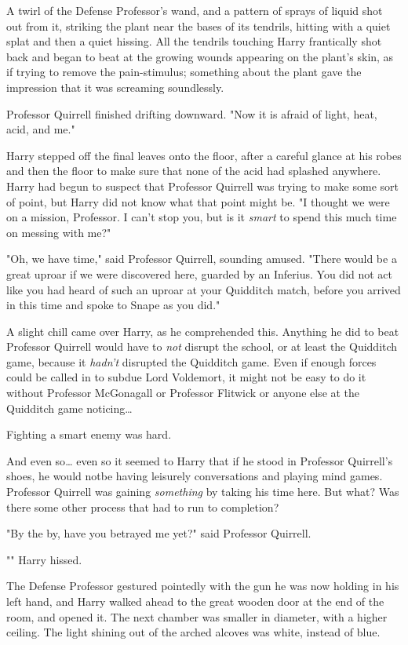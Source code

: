 A twirl of the Defense Professor's wand, and a pattern of sprays of liquid shot 
out from it, striking the plant near the bases of its tendrils, hitting with a 
quiet splat and then a quiet hissing. All the tendrils touching Harry 
frantically shot back and began to beat at the growing wounds appearing on the 
plant's skin, as if trying to remove the pain-stimulus; something about the 
plant gave the impression that it was screaming soundlessly.

Professor Quirrell finished drifting downward. "Now it is afraid of light, 
heat, acid, and me."

Harry stepped off the final leaves onto the floor, after a careful glance at 
his robes and then the floor to make sure that none of the acid had splashed 
anywhere. Harry had begun to suspect that Professor Quirrell was trying to make 
some sort of point, but Harry did not know what that point might be. "I thought 
we were on a mission, Professor. I can't stop you, but is it \emph{smart} to 
spend this much time on messing with me?"

"Oh, we have time," said Professor Quirrell, sounding amused. "There would be a 
great uproar if we were discovered here, guarded by an Inferius. You did not 
act like you had heard of such an uproar at your Quidditch match, before you 
arrived in this time and spoke to Snape as you did."

A slight chill came over Harry, as he comprehended this. Anything he did to 
beat Professor Quirrell would have to \emph{not} disrupt the school, or at 
least the Quidditch game, because it \emph{hadn't} disrupted the Quidditch 
game. Even if enough forces could be called in to subdue Lord Voldemort, it 
might not be easy to do it without Professor McGonagall or Professor Flitwick 
or anyone else at the Quidditch game noticing{\ldots}

Fighting a smart enemy was hard.

And even so{\ldots} even so it seemed to Harry that if he stood in Professor 
Quirrell's shoes, he would notbe having leisurely conversations and playing 
mind games. Professor Quirrell was gaining \emph{something} by taking his time 
here. But what? Was there some other process that had to run to completion?

"By the by, have you betrayed me yet?" said Professor Quirrell.

"" Harry hissed.

The Defense Professor gestured pointedly with the gun he was now holding in his 
left hand, and Harry walked ahead to the great wooden door at the end of the 
room, and opened it.
\sbreak
The next chamber was smaller in diameter, with a higher ceiling. The light 
shining out of the arched alcoves was white, instead of blue.


